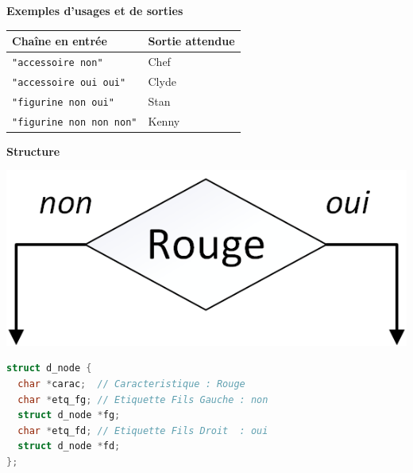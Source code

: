 \documentclass[11pt,a4paper]{article}
\begin{document}
\bigskip


\noindent \textbf{Exemples d'usages et de sorties}

\begin{center}
\begin{tabular}{|l|l|}
\hline
\textbf{Chaîne en entrée} & \textbf{Sortie attendue} \\
\hline
\texttt{"accessoire non"} & Chef \\ \hline
\texttt{"accessoire oui oui"} & Clyde \\ \hline
\texttt{"figurine non oui"} & Stan \\ \hline
\texttt{"figurine non non non"} & Kenny \\ \hline
\end{tabular}
\end{center}

\medskip


\noindent \textbf{Structure}

\begin{table}[ht!]
  \centering
  \begin{minipage}{0.30\textwidth}
    \centering

\begin{center}
\includegraphics[scale=0.55]{img/DecisionTree_Node_dec.png}
\end{center}

  \end{minipage}
  \hfillx
  \begin{minipage}{0.70\textwidth}
    \centering

\begin{lstlisting}[language=C,commentstyle=\color{commentgreen}]
struct d_node {
  char *carac;  // Caracteristique : Rouge
  char *etq_fg; // Etiquette Fils Gauche : non
  struct d_node *fg;
  char *etq_fd; // Etiquette Fils Droit  : oui
  struct d_node *fd;
}; \end{lstlisting}

  \end{minipage}
\end{table}
\end{document}
